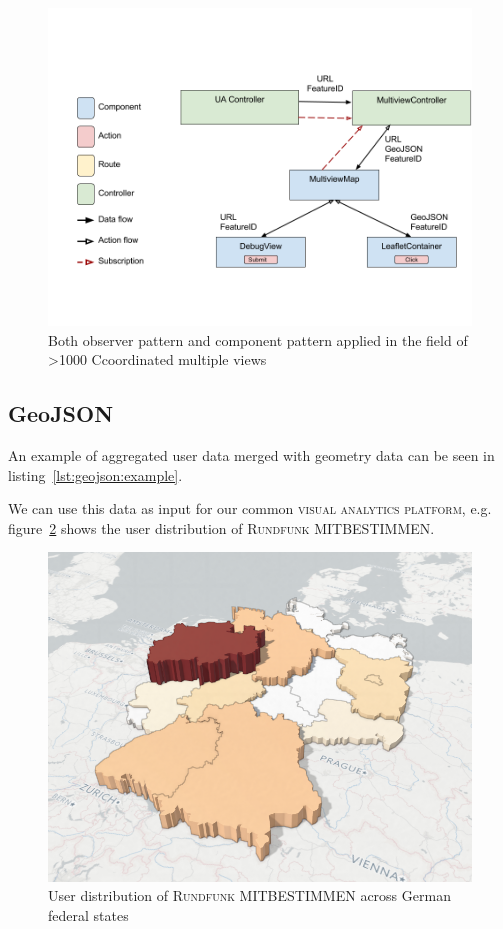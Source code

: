 \documentclass{article}
\newcommand{\rufu}{\textsc{Rundfunk MITBESTIMMEN}}
\newcommand{\visan}{\textsc{visual analytics platform}}
\newcommand\hmm[1]{\ifnum\ifhmode\spacefactor\else2000\fi>1000 \uppercase{#1}\else#1\fi}
\newcommand{\cmvs}{\hmm{c}oordinated multiple views}
\begin{document}
\begin{figure}[h!]
  \centering
  \includegraphics[width=\textwidth]{images/both-patterns-implemented.png}
  \caption{Both observer pattern and component pattern applied in the field of \cmvs{}}
  \label{fig:implementation:both-patterns}
\end{figure}


\subsection{GeoJSON}

An example of aggregated user data merged with geometry data can be seen in listing~\ref{lst:geojson:example}.


We can use this data as input for our common \visan{}, e.g. figure~\ref{fig:implementation:user_distribution} shows the user distribution of \rufu{}.

\begin{figure}[h!]
  \centering
  \includegraphics[width=\textwidth]{images/ua_example.png}
  \caption{User distribution of \rufu{} across German federal states}
  \label{fig:implementation:user_distribution}
\end{figure}


\clearpage
\printbibliography
\end{document}
